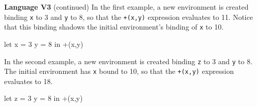 \begin{minipage}[t]{\sw}
\slidenumber
\LARGE
{\bf Language V3} (continued)\exx
In the first example, a new environment is created
binding \verb'x' to 3 and \verb'y' to 8,
so that the \verb'+(x,y)' expression evaluates to 11.
Notice that this binding shadows the initial environment's binding
of \verb'x' to 10.
\begin{qv}
let x = 3 y = 8
in +(x,y)
\end{qv}
In the second example, a new environment is created
binding \verb'z' to 3 and \verb'y' to 8.
The initial environment has \verb'x' bound to 10,
so that the \verb'+(x,y)' expression evaluates to 18.
\begin{qv}
let z = 3 y = 8
in +(x,y)
\end{qv}
\end{minipage}
